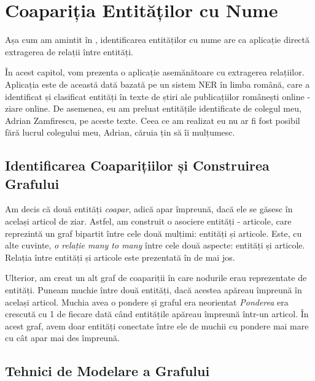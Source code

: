 \chapter{Coapariția Entităților cu Nume}
\label{chap:entities-cooccurrence}

Așa cum am amintit în , identificarea entităților cu nume are ca aplicație directă extragerea de relații între entități.

În acest capitol, vom prezenta o aplicație asemănătoare cu extragerea relațiilor. Aplicația este de această dată bazată pe un sistem NER în limba română, care a identificat și clasificat entități în texte de știri ale publicațiilor românești online - ziare online. De asemenea, eu am preluat entitățile identificate de colegul meu, Adrian Zamfirescu, pe aceste texte. Ceea ce am realizat eu nu ar fi fost posibil fără lucrul colegului meu, Adrian, căruia țin să îi mulțumesc. 

\section{Identificarea Coaparițiilor și Construirea Grafului}

Am decis că două entități \textit{coapar}, adică apar împreună, dacă ele se găsesc în același articol de ziar. Astfel, am construit o asociere entități - articole, care reprezintă un graf bipartit între cele două mulțimi: entități și articole. Este, cu alte cuvinte, \textit{o relație many to many} între cele două aspecte: entități și articole. Relația între entități și articole este prezentată în  de mai jos.


Ulterior, am creat un alt graf de coapariții în care nodurile erau reprezentate de entități. Puneam muchie între două entități, dacă acestea apăreau împreună în același articol. Muchia avea o pondere și graful era neorientat \textit{Ponderea} era crescută cu 1 de fiecare dată când entitățile apăreau împreună într-un articol. În acest graf, avem doar entități conectate între ele de muchii cu pondere mai mare cu cât apar mai des împreună.

\section{Tehnici de Modelare a Grafului}

